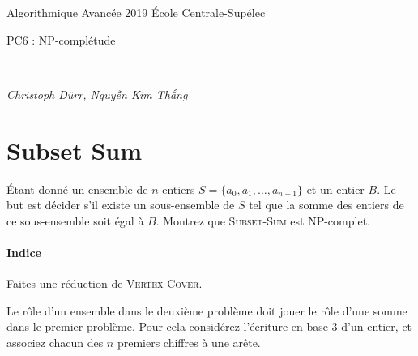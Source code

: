 \documentclass[12pt]{article}
\newcommand{\MakeScribeTop}[1]{
\noindent
\begin{framed}
\noindent
 Algorithmique Avancée 2019
 \hfill
 École Centrale-Supélec
 \\[1em]
 \centerline{ \Large
#1
 }
 \\[1em]
\centerline{  \it Christoph Dürr, Nguyễn Kim Thắng}
\end{framed}
}
\begin{document}
    \MakeScribeTop{PC6 : NP-complétude}


\section{Subset Sum}

Étant donné un ensemble de $n$ entiers $S=\{a_0, a_1, \ldots, a_{n-1}\}$ et un entier $B$. 
Le but est décider s'il existe un sous-ensemble de $S$ tel que la somme des entiers de ce sous-ensemble soit égal à $B$.
Montrez que \textsc{Subset-Sum} est NP-complet. 

\paragraph{Indice} 
Faites une réduction de \textsc{Vertex Cover}.  

Le rôle d'un ensemble dans le deuxième problème doit jouer le rôle d'une somme dans le premier problème. Pour cela considérez l'écriture en base $3$ d'un entier, et associez chacun des $n$ premiers chiffres à une arête.  

%
\end{document}
